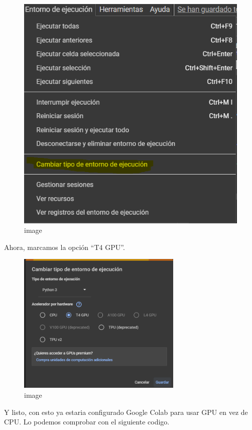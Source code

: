\documentclass[11pt]{article}
\begin{document}
    \begin{figure}
\centering
\includegraphics{imgs/Cambiar entorno a GPU.png}
\caption{image}
\end{figure}

    Ahora, marcamos la opción ``T4 GPU''.

    \begin{figure}
\centering
\includegraphics[width=0.7\textwidth]{imgs/Seleccionar T4 GPU.png}
\caption{image}
\end{figure}

    Y listo, con esto ya estaria configurado Google Colab para usar GPU en
vez de CPU. Lo podemos comprobar con el siguiente codigo.
\end{document}
